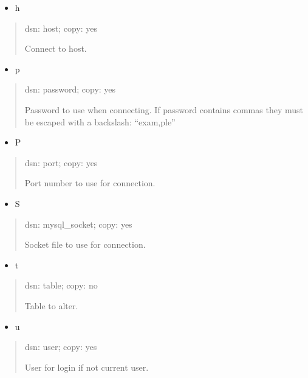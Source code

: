 \documentclass[letterpaper,10pt,english]{sphinxmanual}
\begin{document}
\begin{itemize}
\item {} 
\sphinxAtStartPar
h

\end{itemize}
\begin{quote}

\sphinxAtStartPar
dsn: host; copy: yes

\sphinxAtStartPar
Connect to host.
\end{quote}
\begin{itemize}
\item {} 
\sphinxAtStartPar
p

\end{itemize}
\begin{quote}

\sphinxAtStartPar
dsn: password; copy: yes

\sphinxAtStartPar
Password to use when connecting.
If password contains commas they must be escaped with a backslash: “exam,ple”
\end{quote}
\begin{itemize}
\item {} 
\sphinxAtStartPar
P

\end{itemize}
\begin{quote}

\sphinxAtStartPar
dsn: port; copy: yes

\sphinxAtStartPar
Port number to use for connection.
\end{quote}
\begin{itemize}
\item {} 
\sphinxAtStartPar
S

\end{itemize}
\begin{quote}

\sphinxAtStartPar
dsn: mysql\_socket; copy: yes

\sphinxAtStartPar
Socket file to use for connection.
\end{quote}
\begin{itemize}
\item {} 
\sphinxAtStartPar
t

\end{itemize}
\begin{quote}

\sphinxAtStartPar
dsn: table; copy: no

\sphinxAtStartPar
Table to alter.
\end{quote}
\begin{itemize}
\item {} 
\sphinxAtStartPar
u

\end{itemize}
\begin{quote}

\sphinxAtStartPar
dsn: user; copy: yes

\sphinxAtStartPar
User for login if not current user.
\end{quote}
\end{document}
